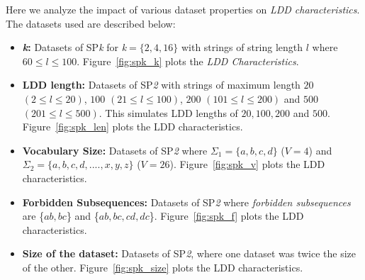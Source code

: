 \documentclass[a0,portrait]{a0poster}
\begin{document}
\begin{multicols}{2}
\color{black}

Here we analyze the impact of various dataset properties on \emph{LDD characteristics}. The datasets used are described below:

\begin{itemize}
    \item \textbf{\emph{k}:} Datasets of SP\emph{k} for \emph{k}${=}\{2, 4, 16 \}$ with strings of string length $l$ where $60 {\leq} l {\leq} 100$. Figure~\ref{fig:spk_k} plots the \emph{LDD Characteristics}.
    \item \textbf{LDD length:} Datasets of SP\emph{2} with strings of maximum length $20$ $(2 {\leq} l {\leq} 20)$, $100$ $(21 {\leq} l {\leq} 100)$, $200$ $(101 {\leq} l {\leq} 200)$ and $500$ $(201 {\leq} l {\leq} 500)$. This simulates LDD lengths of $20, 100, 200$ and $500$. Figure~\ref{fig:spk_len} plots the LDD characteristics. 
    \item \textbf{Vocabulary Size:} Datasets of SP\emph{2} where $\Sigma_1 {=} \{ a,b,c,d \}$ ($V {=} 4$) and $\Sigma_2 {=} \{ a,b,c,d,....,x,y,z \}$ ($V {=} 26$). Figure~\ref{fig:spk_v} plots the LDD characteristics.
    \item \textbf{Forbidden Subsequences:} Datasets of SP\emph{2} where \emph{forbidden subsequences} are \{$ab, bc$\} and \{$ab, bc, cd, dc$\}. Figure~\ref{fig:spk_f} plots the LDD characteristics.
    \item \textbf{Size of the dataset:} Datasets of SP\emph{2}, where one dataset was twice the size of the other. Figure~\ref{fig:spk_size} plots the LDD characteristics.
\end{itemize}


\end{multicols}
\end{document}
